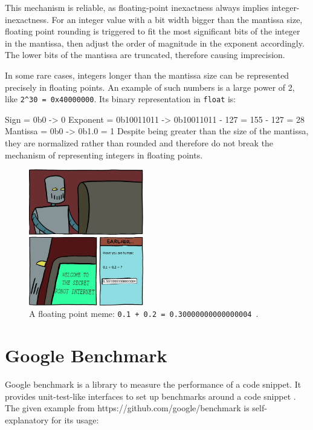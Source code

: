 \documentclass[logo,bsc,singlespacing,parskip]{infthesis}
\newcommand{\dtfloat}{\texttt{float}}
\newenvironment{VerbatimCompact}
  {\vspace*{-2.5mm}\VerbatimEnvironment
   \par\Verbatim}
  {\endVerbatim\vspace*{-2.4mm}}
\begin{document}
This mechanism is reliable, as floating-point inexactness always implies integer\linebreak-inexactness. For an integer value with a bit width bigger than the mantissa size, floating point rounding is triggered to fit the most significant bits of the integer in the mantissa, then adjust the order of magnitude in the exponent accordingly. The lower bits of the mantissa are truncated, therefore causing imprecision. 

In some rare cases, integers longer than the mantissa size can be represented precisely in floating points. An example of such numbers is a large power of 2, like \texttt{2\^{}30 = 0x40000000}. Its binary representation in \dtfloat{} is:
\begin{VerbatimCompact}
Sign     = 0b0        -> 0     
Exponent = 0b10011011 -> 0b10011011 - 127 = 155 - 127 = 28             
Mantissa = 0b0        -> 0b1.0 = 1
\end{VerbatimCompact}
Despite being greater than the size of the mantissa, they are normalized rather than rounded and therefore do not break the mechanism of representing integers in floating points.




\begin{figure}[H]
\begin{center}
    \includegraphics[width=50mm,scale=0.1]{image/0.3004.jpg}
    \caption{A floating point meme: \texttt{0.1 + 0.2 =
    0.30000000000000004}~\cite{meme}.}
    \label{meme}
\end{center}
\end{figure}

\section{Google Benchmark}
Google benchmark is a library to measure the performance of a code snippet. It provides unit-test-like interfaces to set up benchmarks around a code snippet \cite{googlebench}. The given example from https://github.com/google/benchmark is self-explanatory for its usage: 
\end{document}
